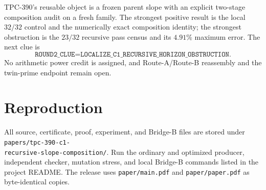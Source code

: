 \documentclass[10pt]{article}
\begin{document}
TPC-390's reusable object is a frozen parent slope with an explicit two-stage
composition audit on a fresh family.  The strongest positive result is the
local $32/32$ control and the numerically exact composition identity; the
strongest obstruction is the $23/32$ recursive pass census and its $4.91\%$
maximum error.  The next clue is
\[
 \texttt{ROUND2\_CLUE=LOCALIZE\_C1\_RECURSIVE\_HORIZON\_OBSTRUCTION}.
\]
No arithmetic power credit is assigned, and Route-A/Route-B reassembly and
the twin-prime endpoint remain open.

\section*{Reproduction}

All source, certificate, proof, experiment, and Bridge-B files are stored under
\texttt{papers/tpc-390-c1-}\\
\texttt{recursive-slope-composition/}.  Run the ordinary and
optimized producer, independent checker, mutation stress, and local Bridge-B
commands listed in the project README.  The release uses
\texttt{paper/main.pdf} and \texttt{paper/paper.pdf} as byte-identical copies.
\end{document}
